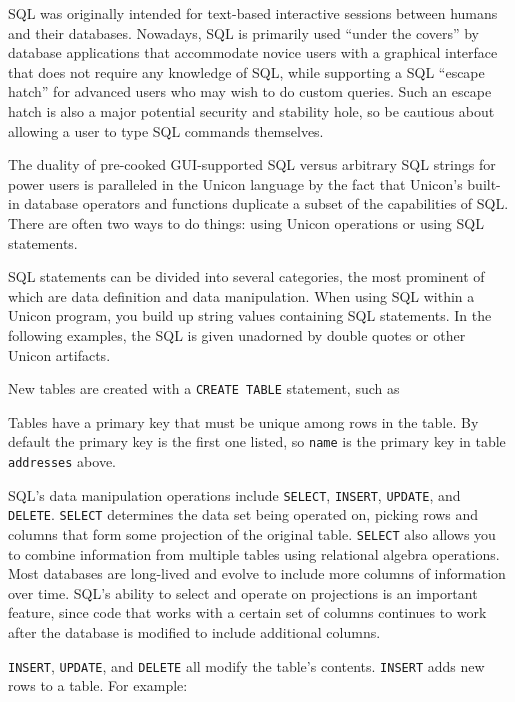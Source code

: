 SQL was originally intended for text-based interactive sessions
between humans and their databases. Nowadays, SQL is primarily used
``under the covers'' by database applications that accommodate novice
users with a graphical interface that does not require any knowledge
of SQL, while supporting a SQL ``escape hatch'' for advanced users who
may wish to do custom queries. Such an escape hatch is also a major
potential security and stability hole, so be cautious about allowing a
user to type SQL commands themselves.

The duality of pre-cooked GUI-supported SQL versus arbitrary SQL
strings for power users is paralleled in the Unicon language by the
fact that Unicon's built-in database operators and functions duplicate
a subset of the capabilities of SQL. There are often two ways to do
things: using Unicon operations or using SQL statements.

SQL statements can be divided into several categories, the most
prominent of which are data definition and data manipulation. When
using SQL within a Unicon program, you build up string values
containing SQL statements. In the following examples, the SQL is given
unadorned by double quotes or other Unicon artifacts.

New tables are created with a \texttt{CREATE TABLE} statement, such as


Tables have a primary key that must be unique among rows in the table.
By default the primary key is the first one listed, so \texttt{name} is
the primary key in table \texttt{addresses} above.

SQL's data manipulation operations include
\texttt{SELECT}, \texttt{INSERT}, \texttt{UPDATE}, and \texttt{DELETE}.
\texttt{SELECT} determines the data set being operated on,
picking rows and columns that form some projection of the original
table. \texttt{SELECT} also allows you to combine
information from multiple tables using relational algebra operations.
Most databases are long-lived and evolve to include more columns of
information over time. SQL's ability to select and
operate on projections is an important feature, since code that works
with a certain set of columns continues to work after the database is
modified to include additional columns.

\texttt{INSERT}, \texttt{UPDATE}, and \texttt{DELETE} all modify the
table's contents. \texttt{INSERT} adds new rows to a
table. For example:

